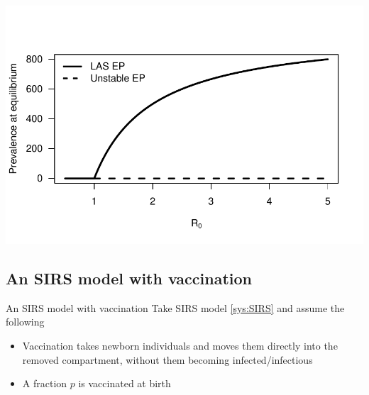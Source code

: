 \documentclass[aspectratio=169]{beamer}\usepackage[]{graphicx}\usepackage[]{xcolor}
\begin{document}
\begin{frame}
  \begin{center}
    \includegraphics[width=\textwidth]{FIGS/course-01-SIRS_bifurcation_R0-1.pdf}
  \end{center}
\end{frame}



\subsection{An SIRS model with vaccination}

\begin{frame}{An SIRS model with vaccination}
Take SIRS model \eqref{sys:SIRS} and assume the following
\vfill
\begin{itemize}
\item Vaccination takes newborn individuals and moves them directly into the removed compartment, without them becoming infected/infectious
\vfill
\item A fraction $p$ is vaccinated at birth
\end{itemize}
\end{frame}
\end{document}
